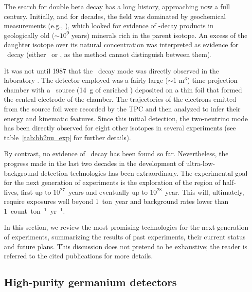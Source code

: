 The search for double beta decay has a long history, approaching now a full century. Initially, and for decades, the field was dominated by geochemical measurements (e.g., \cite{Inghram:1950qv}), which looked for evidence of \bb-decay products in geologically old ($\sim 10^9$ years) minerals rich in the parent isotope. An excess of the daughter isotope over its natural concentration was interpreted as evidence for \bb\ decay (either \bbtnu\ or \bbonu, as the method cannot distinguish between them). 

It was not until 1987 that the \bbtnu\ decay mode was directly observed in the laboratory \cite{Elliott:1987kp,Moe:2014ioa}. The detector employed was a fairly large ($\sim1$ m$^{3}$) time projection chamber with a \bb\ source (14~g of enriched ) deposited on a thin foil that formed the central electrode of the chamber. The trajectories of the electrons emitted from the source foil were recorded by the TPC and then analyzed to infer their energy and kinematic features. Since this initial detection, the two-neutrino mode has been directly observed for eight other isotopes in several experiments (see table~\ref{tab:bb2nu_exp} for further details).

By contrast, no evidence of \bbonu\ decay has been found so far. Nevertheless, the progress made in the last two decades in the development of ultra-low-background detection technologies has been extraordinary. The experimental goal for the next generation of experiments is the exploration of the region of half-lives, first up to $10^{27}$~years and eventually up to $10^{28}$~year. This will, ultimately, require exposures well beyond 1~ton~year and background rates lower than 1~count~ton$^{-1}$~yr$^{-1}$. 

In this section, we review the most promising technologies for the next generation of experiments, summarizing the results of past experiments, their current status and future plans. This discussion does not pretend to be exhaustive; the reader is referred to the cited publications for more details.

\subsection{High-purity germanium detectors} 
\label{subsec:hpge}


